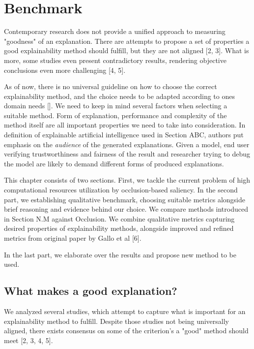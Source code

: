 \chapter{Benchmark}

Contemporary research does not provide a unified approach to measuring "goodness" of an explanation. There are attempts to propose a set of properties a good explainability method should fulfill, but they are not aligned [2, 3]. What is more, some studies even present contradictory results, rendering objective conclusions even more challenging [4, 5].

As of now, there is no universal guideline on how to choose the correct explainability method, and the choice needs to be adapted according to ones domain needs []. We need to keep in mind several factors when selecting a suitable method. Form of explanation, performance and complexity of the method itself are all important properties we need to take into consideration. In definition of explainable artificial intelligence used in Section ABC, authors put emphasis on the \emph{audience} of the generated explanations. Given a model, end user verifying trustworthiness and fairness of the result and researcher trying to debug the model are likely to demand different forms of produced explanations. 

This chapter consists of two sections. First, we tackle the current problem of high computational resources utilization by occlusion-based saliency. In the second part, we establishing qualitative benchmark, choosing suitable metrics alongside brief reasoning and evidence behind our choice. We compare methods introduced in Section N.M against Occlusion. We combine qualitative metrics capturing desired properties of explainability methods, alongside improved and refined metrics from original paper by Gallo et al [6].

In the last part, we elaborate over the results and propose new method to be used.

\section{What makes a good explanation?}

We analyzed several studies, which attempt to capture what is important for an explainability method to fulfill. Despite those studies not being universally aligned, there exists consensus on some of the criterion's a "good" method should meet [2, 3, 4, 5]. 

